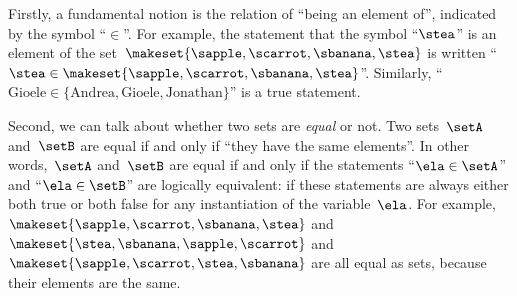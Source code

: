 
Firstly, a fundamental notion is the relation of ``being an element of'', indicated by the symbol ``$\in$''.
For example, the statement that the symbol ``$\stea$'' is an element of the set~$\makeset{ \sapple, \scarrot, \sbanana, \stea }$ is written ``$\stea \in \makeset{ \sapple, \scarrot, \sbanana, \stea }$''.
Similarly, ``$\text{Gioele} \in \{ \text{Andrea}, \text{Gioele}, \text{Jonathan} \}$'' is a true statement.

Second, we can talk about whether two sets are \emph{equal} or not.
Two sets~$\setA$ and~$\setB$ are equal if and only if ``they have the same elements''.
In other words,~$\setA$ and~$\setB$ are equal if and only if the statements
``$\ela \in \setA$'' and ``$\ela \in \setB$'' are logically equivalent:
if these statements are always either both true or both false for any instantiation of the variable~$\ela$.
For example, $\makeset{ \sapple, \scarrot, \sbanana, \stea }$ and~$\makeset{ \stea, \sbanana, \sapple, \scarrot}$ and~$\makeset{ \sapple, \scarrot, \stea, \sbanana }$ are all equal as sets, because their elements are the same.

